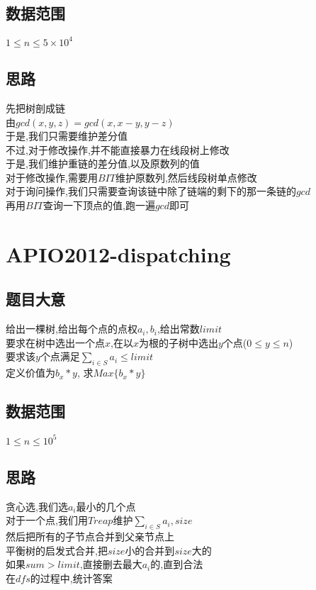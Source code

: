 \documentclass{ctexart}
\numberwithin{equation}{section}
\begin{document}
\begin{flushleft}
  \subsection{数据范围}
  $1\le n\le 5\times 10^4$\\
  \subsection{思路}
  先把树剖成链\\
  由$gcd(x,y,z)=gcd(x,x-y,y-z)$\\
  于是,我们只需要维护差分值\\
  不过,对于修改操作,并不能直接暴力在线段树上修改\\
  于是,我们维护重链的差分值,以及原数列的值\\
  对于修改操作,需要用$BIT$维护原数列,然后线段树单点修改\\
  对于询问操作,我们只需要查询该链中除了链端的剩下的那一条链的$gcd$\\
  再用$BIT$查询一下顶点的值,跑一遍$gcd$即可\\
  \newpage

  \section{APIO2012-dispatching}
  \subsection{题目大意}
  给出一棵树,给出每个点的点权$a_i,b_i$,给出常数$limit$\\
  要求在树中选出一个点$x$,在以$x$为根的子树中选出$y$个点($0\le y\le n$)\\
  要求该$y$个点满足$\sum_{i\in S}a_i \leq limit$\\
  定义价值为$b_x*y$, 求$Max\{b_x*y\}$\\
  \subsection{数据范围}
  $1\le n\le 10^5$\\
  \subsection{思路}
  贪心选,我们选$a_i$最小的几个点\\
  对于一个点,我们用$Treap$维护$\sum_{i\in S}a_i, size$\\
  然后把所有的子节点合并到父亲节点上\\
  平衡树的启发式合并,把$size$小的合并到$size$大的\\
  如果$sum > limit$,直接删去最大$a_i$的,直到合法\\
  在$dfs$的过程中,统计答案\\
  \newpage


\end{flushleft}
\end{document}
